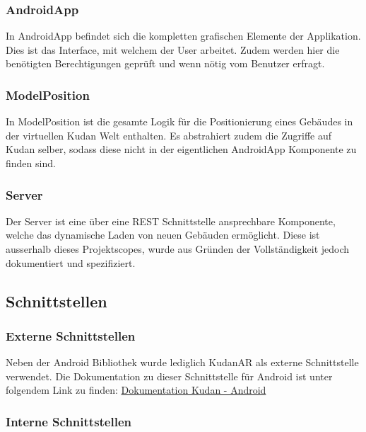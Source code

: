 \documentclass[a4paper]{scrreprt}
\begin{document}
\subsubsection{AndroidApp}
In AndroidApp befindet sich die kompletten grafischen Elemente der Applikation. Dies ist das Interface, mit welchem der User arbeitet. Zudem werden hier die benötigten Berechtigungen geprüft und wenn nötig vom Benutzer erfragt.

\subsubsection{ModelPosition}
In ModelPosition ist die gesamte Logik für die Positionierung eines Gebäudes in der virtuellen Kudan Welt enthalten. Es abstrahiert zudem die Zugriffe auf Kudan selber, sodass diese nicht in der eigentlichen AndroidApp Komponente zu finden sind.

\subsubsection{Server}
Der Server ist eine über eine REST Schnittstelle ansprechbare Komponente, welche das dynamische Laden von neuen Gebäuden ermöglicht. Diese ist ausserhalb dieses Projektscopes, wurde aus Gründen der Vollständigkeit jedoch dokumentiert und spezifiziert.

\subsection{Schnittstellen}
\subsubsection{Externe Schnittstellen}
Neben der Android Bibliothek wurde lediglich KudanAR als externe Schnittstelle verwendet. Die Dokumentation zu dieser Schnittstelle für Android ist unter folgendem Link zu finden:
\href{https://www.kudan.eu/docs-reference/AndroidDocs/annotated.html}{Dokumentation Kudan - Android}


\subsubsection{Interne Schnittstellen}
\end{document}
